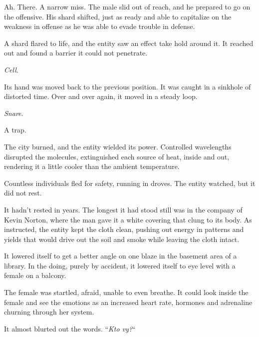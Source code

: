 Ah.  There.  A narrow miss.  The male slid out of reach, and he prepared to go on the offensive.  His shard shifted, just as ready and able to capitalize on the weakness in offense as he was able to evade trouble in defense.



A shard flared to life, and the entity saw an effect take hold around it.  It reached out and found a barrier it could not penetrate.



\emph{Cell}.



Its hand was moved back to the previous position.  It was caught in a sinkhole of distorted time.  Over and over again, it moved in a steady loop.



\emph{Snare}.



A trap.



\sectionbreak



The city burned, and the entity wielded its power.  Controlled wavelengths disrupted the molecules, extinguished each source of heat, inside and out, rendering it a little cooler than the ambient temperature.



Countless individuals fled for safety, running in droves.  The entity watched, but it did not rest.



It hadn't rested in years.  The longest it had stood still was in the company of Kevin Norton, where the man gave it a white covering that clung to its body.  As instructed, the entity kept the cloth clean, pushing out energy in patterns and yields that would drive out the soil and smoke while leaving the cloth intact.



It lowered itself to get a better angle on one blaze in the basement area of a library.  In the doing, purely by accident, it lowered itself to eye level with a female on a balcony.



The female was startled, afraid, unable to even breathe.  It could look inside the female and see the emotions as an increased heart rate, hormones and adrenaline churning through her system.



It almost blurted out the words.  ``\emph{Kto vy?}``



